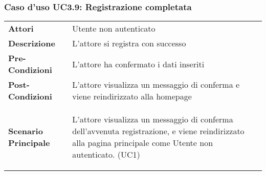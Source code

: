 \subsubsection{Caso d'uso UC3.9:  Registrazione completata}
\label{UC3_9}

\begin{minipage}{\linewidth}
\begin{longtable}{ l | p{11cm}}
	\hline
	\rowcolor{Gray}
	\multicolumn{2}{c}{UC3.9 - Registrazione completata} \\
	\hline
	\textbf{Attori} & Utente non autenticato \\
	\textbf{Descrizione} & L'attore si registra con successo  \\
	\textbf{Pre-Condizioni} & L'attore ha confermato i dati inseriti \\
	\textbf{Post-Condizioni} & L'attore visualizza un messaggio di conferma e viene reindirizzato alla homepage \\
	\textbf{Scenario Principale} & \begin{enumerate*}[label=(\arabic*.),itemjoin={\newline}]
		\item L'attore visualizza un messaggio di conferma dell'avvenuta registrazione, e viene reindirizzato alla pagina principale come Utente non autenticato. (UC1)
	\end{enumerate*}\\
\end{longtable}
\end{minipage}